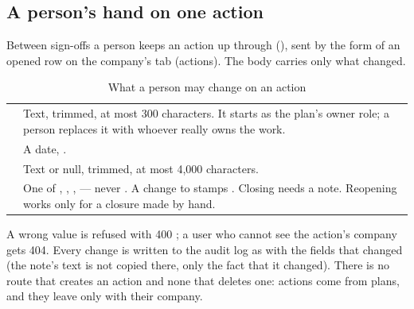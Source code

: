 \subsection{A person's hand on one action}

Between sign-offs a person keeps an action up through
 (), sent by the form of an opened row on
the company's tab  (actions). The body carries only what changed.

\begin{table}[H]
\caption{What a person may change on an action}\label{tab:register:patch}
\begin{tabularx}{\textwidth}{@{}L{20mm}Y@{}}
\toprule
{} &  \\
\midrule
{} & Text, trimmed, at most 300 characters. It starts as the plan's owner role; a
  person replaces it with whoever really owns the work. \\
 & A date, . \\
 & Text or null, trimmed, at most 4,000 characters. \\
 & One of , , ,  --- never
  . A change to  stamps . Closing needs a note. Reopening
  works only for a closure made by hand. \\
\bottomrule
\end{tabularx}
\end{table}

A wrong value is refused with 400 ; a user who cannot see the action's
company gets 404. Every change is written to the audit log as  with the
fields that changed (the note's text is not copied there, only the fact that it changed).
There is no route that creates an action and none that deletes one: actions come from plans,
and they leave only with their company.

